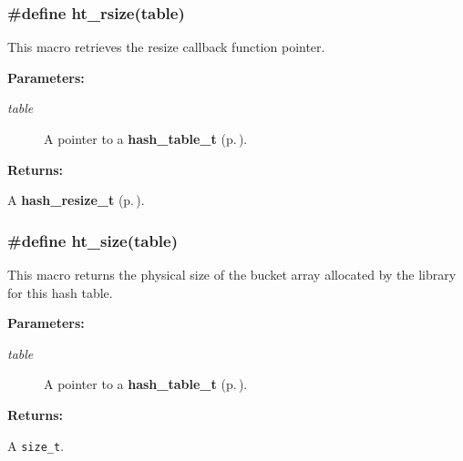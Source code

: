 \subsubsection{\setlength{\rightskip}{0pt plus 5cm}\#define ht\_\-rsize(table)}\label{group__dbprim__hash_a26}




 This macro retrieves the resize callback function pointer.\begin{Desc}
\item[{\bf Parameters: }]\par
\begin{description}
\item[
{\em table}]A pointer to a {\bf hash\_\-table\_\-t} {\rm (p.\,\pageref{group__dbprim__hash_a0})}.

\end{description}
\end{Desc}
\begin{Desc}
\item[{\bf Returns: }]\par
A {\bf hash\_\-resize\_\-t} {\rm (p.\,\pageref{group__dbprim__hash_a5})}. \end{Desc}
\subsubsection{\setlength{\rightskip}{0pt plus 5cm}\#define ht\_\-size(table)}\label{group__dbprim__hash_a28}




 This macro returns the physical size of the bucket array allocated by the library for this hash table.\begin{Desc}
\item[{\bf Parameters: }]\par
\begin{description}
\item[
{\em table}]A pointer to a {\bf hash\_\-table\_\-t} {\rm (p.\,\pageref{group__dbprim__hash_a0})}.

\end{description}
\end{Desc}
\begin{Desc}
\item[{\bf Returns: }]\par
A {\tt size\_\-t}. \end{Desc}
